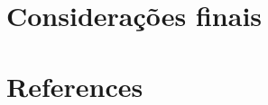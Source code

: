 \documentclass[review]{elsarticle}
\begin{document}
\section{Considerações finais}
\label{sec:conclu}
\noindent


\section*{References}

\end{document}
